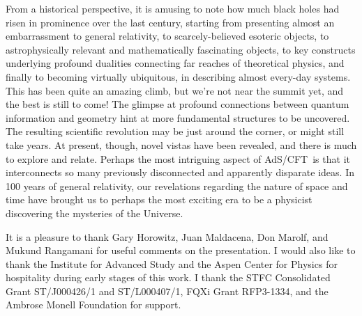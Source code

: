 \documentclass[12pt,a4paper]{article}
\def\AC{AdS/CFT}
\def\GR{general relativity}
\begin{document}
From a historical perspective, it is amusing to note how much black holes had risen in prominence over the last century,
starting from presenting almost an embarrassment to general relativity, to scarcely-believed esoteric objects, to astrophysically relevant and mathematically fascinating objects, to key constructs underlying profound dualities connecting far reaches of theoretical physics, and finally to becoming virtually ubiquitous, in describing almost every-day systems.  This has been quite an amazing climb, but we're not near the summit yet, and the best is still to come!  The glimpse at profound connections between quantum information and geometry hint at more fundamental structures to be uncovered.  The resulting scientific revolution may be just around the corner, or might still take years.  At present, though, novel vistas have been revealed, and there is much to explore and relate.
Perhaps the most intriguing aspect of  \AC\ is that it interconnects so many previously disconnected and apparently disparate ideas.
In 100 years of \GR, our revelations regarding the nature of space and time  have brought us to perhaps the most exciting era to be a physicist discovering the mysteries of the Universe.


\acknowledgments 

It is a pleasure to thank Gary Horowitz, Juan Maldacena, Don Marolf, and Mukund Rangamani for useful comments on the presentation.
I would also like to thank the  Institute for Advanced Study and the Aspen Center for Physics for hospitality during early stages of this work.
I thank the STFC Consolidated Grant ST/J000426/1 and  ST/L000407/1, FQXi Grant RFP3-1334, and the Ambrose Monell Foundation for support.


%
%
\end{document}
